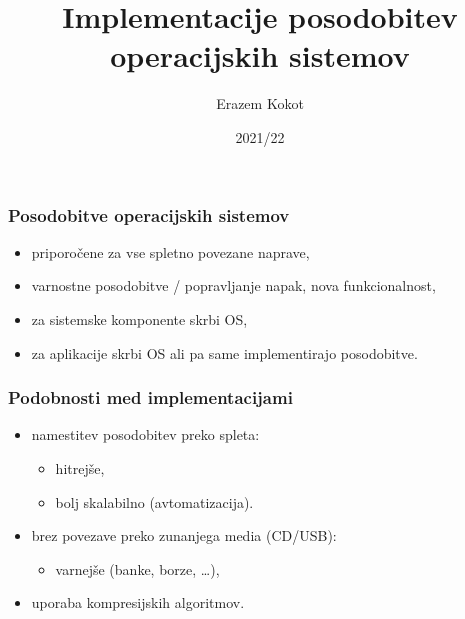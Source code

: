 \documentclass[aspectratio=169]{beamer}
\title{Implementacije posodobitev operacijskih sistemov}
\author{Erazem Kokot}
\institute[FRI]{Sistemska programska oprema,\\Fakulteta za računalništvo in informatiko}
\date{2021/22}
\begin{document}
    \begin{frame}
    \titlepage{}
    \end{frame}

    \begin{frame}
        \frametitle{Posodobitve operacijskih sistemov}
        \begin{itemize}
            \item priporočene za vse spletno povezane naprave,
            \item varnostne posodobitve / popravljanje napak, nova funkcionalnost,
            \item za sistemske komponente skrbi OS,
            \item za aplikacije skrbi OS ali pa same implementirajo posodobitve.
        \end{itemize}
    \end{frame}

    \begin{frame}
        \frametitle{Podobnosti med implementacijami}
        \begin{itemize}
            \item namestitev posodobitev preko spleta:
            \begin{itemize}
                \item hitrejše,
                \item bolj skalabilno (avtomatizacija).
            \end{itemize}
            \item brez povezave preko zunanjega media (CD/USB):
            \begin{itemize}
                \item varnejše (banke, borze, \ldots),
            \end{itemize}
            \item uporaba kompresijskih algoritmov.
        \end{itemize}
    \end{frame}

\end{document}

